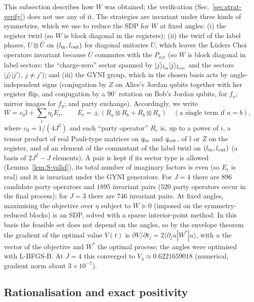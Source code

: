\documentclass[aps,pra,onecolumn,notitlepage,superscriptaddress,longbibliography,nofootinbib,11pt]{revtex4-2}
\theoremstyle{remark}
\newcommand{\ket}[1]{\lvert #1\rangle}
\newcommand{\one}{\mathbb{I}}
\begin{document}
This subsection describes how $W$ was obtained; the verification (Sec.~\ref{sec:strat-verify}) does not use any of it. The strategies are invariant under three kinds of symmetries, which we use to reduce the SDP for $W$ at fixed angles: (i) the register twirl (so $W$ is block diagonal in the registers); (ii) the twirl of the label phases, $U\otimes\bar U$ on $(l_{\rm in},l_{\rm out})$ for diagonal unitaries $U$, which leaves the L\"uders Choi operators invariant because $U$ commutes with the $P_{a|x}$ (so $W$ is block diagonal in label sectors: the ``charge-zero'' sector spanned by $\ket{j}_{l_{\rm in}}\ket{j}_{l_{\rm out}}$ and the sectors $\ket{j}\ket{j'}$, $j\neq j'$); and (iii) the GYNI group, which in the chosen basis acts by angle-independent signs (conjugation by $Z$ on Alice's Jordan qubits together with her register flip, and conjugation by a $90^\circ$ rotation on Bob's Jordan qubits, for $f_x$; mirror images for $f_y$; and party exchange). Accordingly, we write
\begin{equation}
W=c_0\one+\sum_t\eta_tE_t,\qquad E_t=\pm\,(R_a\otimes R_b+R_b\otimes R_a)\quad(\text{a single term if }a=b),
\end{equation}
where $c_0=1/(4J^2)$ and each ``party operator'' $R_e$ is, up to a power of $i$, a tensor product of real Pauli-type matrices on $q_{\rm in}$ and $q_{\rm out}$, of $\one$ or $Z$ on the register, and of an element of the commutant of the label twirl on $(l_{\rm in},l_{\rm out})$ (a basis of $2J^2-J$ elements). A pair is kept if its sector type is allowed (Lemma~\ref{lem:S-valid}), its total number of imaginary factors is even (so $E_t$ is real) and it is invariant under the GYNI generators. For $J=4$ there are $896$ candidate party operators and $1895$ invariant pairs ($520$ party operators occur in the final process); for $J=3$ there are $746$ invariant pairs. At fixed angles, maximising the objective over $\eta$ subject to $W\succeq0$ (imposed on the symmetry-reduced blocks) is an SDP, solved with a sparse interior-point method. In this basis the feasible set does not depend on the angles, so by the envelope theorem the gradient of the optimal value $V(t)$ is $\partial V/\partial t_j=2\langle\partial_ju|W^\ast|u\rangle$, with $u$ the vector of the objective and $W^\ast$ the optimal process; the angles were optimised with L-BFGS-B. At $J=4$ this converged to $V_4\approx0.6221659018$ (numerical, gradient norm about $3\times10^{-7}$).

\subsection{Rationalisation and exact positivity}
\end{document}
